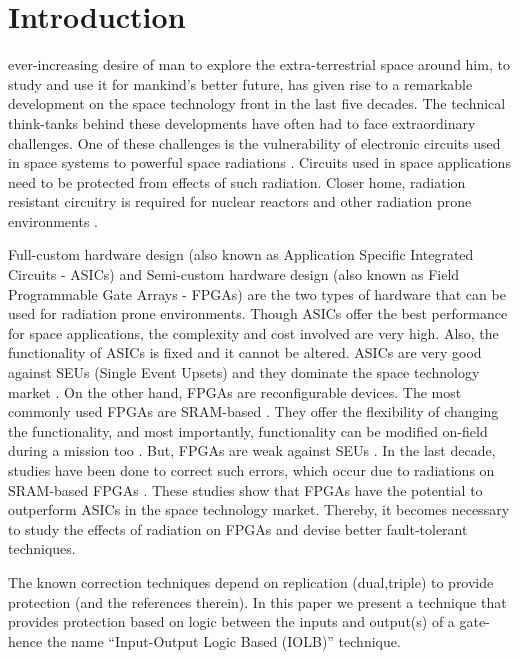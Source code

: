 \documentclass[10pt,journal,cspaper,compsoc]{IEEEtran}
\begin{document}
\IEEEpeerreviewmaketitle

\section{Introduction}
 ever-increasing desire of man to explore the extra-terrestrial space around him, to study and use it for mankind's better future, has given rise to a remarkable development on the space technology front in the last five decades. The technical think-tanks behind these developments have often had to face extraordinary challenges. One of these challenges is the vulnerability of electronic circuits used in space systems to powerful space radiations \cite{JoG}. Circuits used in space applications need to be protected from effects of such radiation. Closer home, radiation resistant circuitry is required for nuclear reactors and other radiation prone environments \cite{HoA}.

Full-custom hardware design (also known as Application Specific Integrated Circuits - ASICs) and Semi-custom hardware design (also known as Field Programmable Gate Arrays - FPGAs) are the two types of hardware that can be used for  radiation prone environments. Though ASICs offer the best performance for space applications, the complexity and cost involved are very high. Also, the functionality of ASICs is fixed and it cannot be altered. ASICs are very good against SEUs (Single Event Upsets) and they dominate the space technology market \cite{KCCH,ZhL}. On the other hand, FPGAs are reconfigurable devices. The most commonly used FPGAs are SRAM-based \cite{Cliv}. They offer the flexibility of changing the functionality, and most importantly, functionality can be modified on-field during a mission too \cite{StV,ZhL}. But, FPGAs are weak against SEUs \cite{AdA,ZMAP,AsT,Ol-et}. In the last decade, studies have been done to correct such errors, which occur due to radiations on SRAM-based FPGAs \cite{ZMAP,RCSK,YWZ,AdA,CBGTS}. These studies show that FPGAs have the potential to outperform ASICs in the space technology market. Thereby, it becomes necessary to study the effects of radiation on FPGAs and devise better fault-tolerant techniques.

The known correction techniques depend on replication (dual,triple) to provide protection \cite{Wake,Carm,KNHCR,KLCR} (and the references therein). In this paper we present a technique that provides protection based on logic between the inputs and output(s) of a gate-hence the name ``Input-Output Logic Based (IOLB)'' technique.
\end{document}
